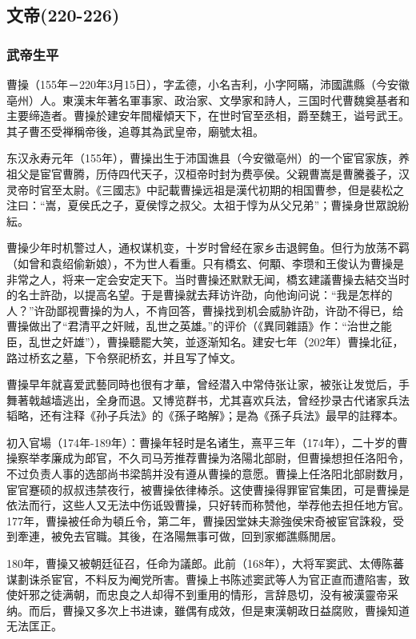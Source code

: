 
\subsection{文帝\tiny(220-226)}

\subsubsection{武帝生平}

曹操（155年－220年3月15日），字孟德，小名吉利，小字阿瞞，沛國譙縣（今安徽亳州）人。東漢末年著名軍事家、政治家、文學家和詩人，三国时代曹魏奠基者和主要缔造者。曹操於建安年間權傾天下，在世时官至丞相，爵至魏王，谥号武王。其子曹丕受禅稱帝後，追尊其為武皇帝，廟號太祖。

东汉永寿元年（155年），曹操出生于沛国谯县（今安徽亳州）的一个宦官家族，养祖父是宦官曹腾，历侍四代天子，汉桓帝时封为费亭侯。父親曹嵩是曹騰養子，汉灵帝时官至太尉。《三國志》中記載曹操远祖是漢代初期的相国曹参，但是裴松之注曰：“嵩，夏侯氏之子，夏侯惇之叔父。太祖于惇为从父兄弟”；曹操身世眾說紛紜。

曹操少年时机警过人，通权谋机变，十岁时曾经在家乡击退鳄鱼。但行为放荡不羁（如曾和袁绍偷新娘），不为世人看重。只有橋玄、何顒、李瓒和王俊认为曹操是非常之人，将来一定会安定天下。当时曹操还默默无闻，橋玄建議曹操去結交当时的名士許劭，以提高名望。于是曹操就去拜访许劭，向他询问说：“我是怎样的人？”许劭鄙视曹操的为人，不肯回答，曹操找到机会威胁许劭，许劭不得已，给曹操做出了“君清平之奸贼，乱世之英雄。”的评价（《異同雜語》作：“治世之能臣，乱世之奸雄”），曹操聽罷大笑，並逐渐知名。建安七年（202年）曹操北征，路过桥玄之墓，下令祭祀桥玄，并且写了悼文。

曹操早年就喜爱武藝同時也很有才華，曾经潜入中常侍张让家，被张让发觉后，手舞著戟越墙逃出，全身而退。又博览群书，尤其喜欢兵法，曾经抄录古代诸家兵法韬略，还有注释《孙子兵法》的《孫子略解》；是為《孫子兵法》最早的註釋本。

初入官場（174年-189年）：曹操年轻时是名诸生，熹平三年（174年），二十岁的曹操察举孝廉成为郎官，不久司马芳推荐曹操为洛陽北部尉，但曹操想担任洛阳令，不过负责人事的选部尚书梁鹄并没有遵从曹操的意愿。曹操上任洛阳北部尉数月，宦官蹇硕的叔叔违禁夜行，被曹操依律棒杀。这使曹操得罪宦官集团，可是曹操是依法而行，这些人又无法中伤诋毁曹操，只好转而称赞他，举荐他去担任地方官。177年，曹操被任命为頓丘令，第二年，曹操因堂妹夫滁強侯宋奇被宦官誅殺，受到牽連，被免去官職。其後，在洛陽無事可做，回到家鄉譙縣閒居。

180年，曹操又被朝廷征召，任命为議郎。此前（168年），大将军窦武、太傅陈蕃谋劃诛杀宦官，不料反为阉党所害。曹操上书陈述窦武等人为官正直而遭陷害，致使奸邪之徒满朝，而忠良之人却得不到重用的情形，言辞恳切，没有被漢靈帝采纳。而后，曹操又多次上书进谏，雖偶有成效，但是東漢朝政日益腐败，曹操知道无法匡正。

